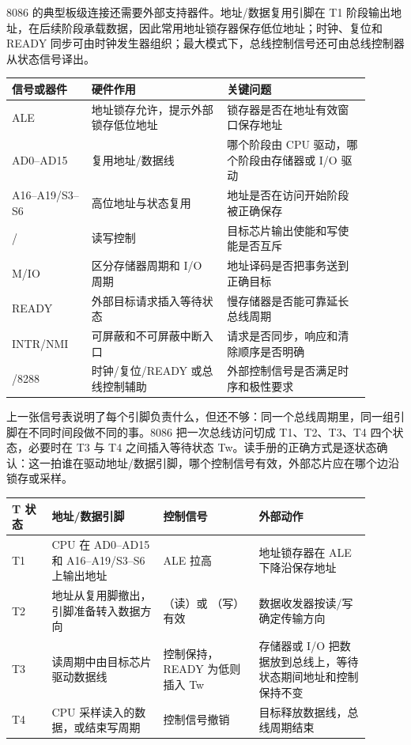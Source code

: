 8086 的典型板级连接还需要外部支持器件。地址/数据复用引脚在 T1 阶段输出地址，在后续阶段承载数据，因此常用地址锁存器保存低位地址；时钟、复位和 READY 同步可由时钟发生器组织；最大模式下，总线控制信号还可由总线控制器从状态信号译出。

\begin{longtable}{L{0.2\linewidth}L{0.34\linewidth}L{0.36\linewidth}}
\toprule
信号或器件 & 硬件作用 & 关键问题 \\
\midrule
ALE & 地址锁存允许，提示外部锁存低位地址 & 锁存器是否在地址有效窗口保存地址 \\\tablerowrule
AD0--AD15 & 复用地址/数据线 & 哪个阶段由 CPU 驱动，哪个阶段由存储器或 I/O 驱动 \\\tablerowrule
A16--A19/S3--S6 & 高位地址与状态复用 & 地址是否在访问开始阶段被正确保存 \\\tablerowrule
{}/ & 读写控制 & 目标芯片输出使能和写使能是否互斥 \\\tablerowrule
M/IO & 区分存储器周期和 I/O 周期 & 地址译码是否把事务送到正确目标 \\\tablerowrule
READY & 外部目标请求插入等待状态 & 慢存储器是否能可靠延长总线周期 \\\tablerowrule
INTR/NMI & 可屏蔽和不可屏蔽中断入口 & 请求是否同步，响应和清除顺序是否明确 \\/8288 & 时钟/复位/READY 或总线控制辅助 & 外部控制信号是否满足时序和极性要求 \\
\bottomrule
\end{longtable}

上一张信号表说明了每个引脚负责什么，但还不够：同一个总线周期里，同一组引脚在不同时间段做不同的事。8086 把一次总线访问切成 T1、T2、T3、T4 四个状态，必要时在 T3 与 T4 之间插入等待状态 Tw。读手册的正确方式是逐状态确认：这一拍谁在驱动地址/数据引脚，哪个控制信号有效，外部芯片应在哪个边沿锁存或采样。

\begin{longtable}{L{0.1\linewidth}L{0.28\linewidth}L{0.24\linewidth}L{0.28\linewidth}}
\toprule
T 状态 & 地址/数据引脚 & 控制信号 & 外部动作 \\
\midrule
T1 & CPU 在 AD0--AD15 和 A16--A19/S3--S6 上输出地址 & ALE 拉高 & 地址锁存器在 ALE 下降沿保存地址 \\\tablerowrule
T2 & 地址从复用脚撤出，引脚准备转入数据方向 & （读）或 （写）有效 & 数据收发器按读/写确定传输方向 \\\tablerowrule
T3 & 读周期中由目标芯片驱动数据线 & 控制保持，READY 为低则插入 Tw & 存储器或 I/O 把数据放到总线上，等待状态期间地址和控制保持不变 \\\tablerowrule
T4 & CPU 采样读入的数据，或结束写周期 & 控制信号撤销 & 目标释放数据线，总线周期结束 \\
\bottomrule
\end{longtable}

